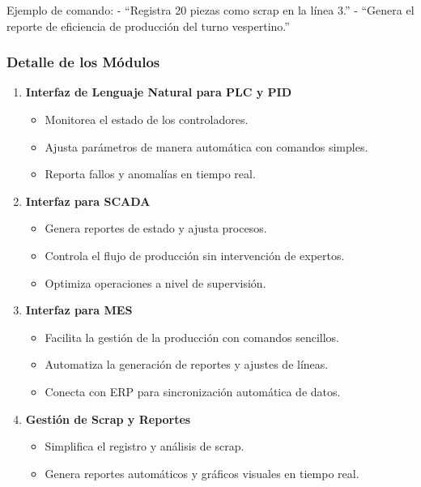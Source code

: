 \documentclass[
  10pt,
  letterpaper,
]{book}
\providecommand{\tightlist}{%
  \setlength{\itemsep}{0pt}\setlength{\parskip}{0pt}}\usepackage{longtable,booktabs,array}
\begin{document}
Ejemplo de comando: - ``Registra 20 piezas como scrap en la línea 3.'' -
``Genera el reporte de eficiencia de producción del turno vespertino.''

\subsubsection{Detalle de los Módulos}\label{detalle-de-los-muxf3dulos}

\begin{enumerate}
\def\labelenumi{\arabic{enumi}.}
\tightlist
\item
  \textbf{Interfaz de Lenguaje Natural para PLC y PID}

  \begin{itemize}
  \tightlist
  \item
    Monitorea el estado de los controladores.
  \item
    Ajusta parámetros de manera automática con comandos simples.
  \item
    Reporta fallos y anomalías en tiempo real.
  \end{itemize}
\item
  \textbf{Interfaz para SCADA}

  \begin{itemize}
  \tightlist
  \item
    Genera reportes de estado y ajusta procesos.
  \item
    Controla el flujo de producción sin intervención de expertos.
  \item
    Optimiza operaciones a nivel de supervisión.
  \end{itemize}
\item
  \textbf{Interfaz para MES}

  \begin{itemize}
  \tightlist
  \item
    Facilita la gestión de la producción con comandos sencillos.
  \item
    Automatiza la generación de reportes y ajustes de líneas.
  \item
    Conecta con ERP para sincronización automática de datos.
  \end{itemize}
\item
  \textbf{Gestión de Scrap y Reportes}

  \begin{itemize}
  \tightlist
  \item
    Simplifica el registro y análisis de scrap.
  \item
    Genera reportes automáticos y gráficos visuales en tiempo real.
  \end{itemize}
\end{enumerate}
\end{document}
